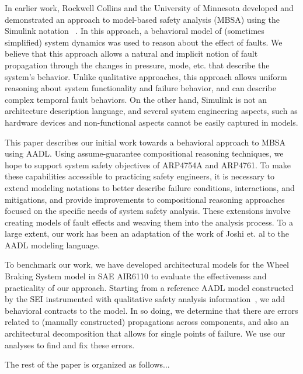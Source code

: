 In earlier work, Rockwell Collins and the University of Minnesota developed and demonstrated an approach to model-based safety analysis (MBSA)  using the Simulink notation~ .  In this approach, a behavioral model of (sometimes simplified) system dynamics was used to reason about the effect of faults.  We believe that this approach allows a natural and implicit notion of fault propagation through the changes in pressure, mode, etc. that describe the system's behavior.  Unlike qualitative approaches, this approach allows uniform reasoning about system functionality and failure behavior, and can describe complex temporal fault behaviors.  On the other hand, Simulink is not an architecture description language, and several system engineering aspects, such as hardware devices and non-functional aspects cannot be easily captured in models.

\iffalse
Over the last five years, several research groups have focused on formal reasoning at the system architecture level, resulting in MBSE tools that incorporate assume-guarantee compositional reasoning techniques~\cite{Trento and Rockwell and UMN}.  These tools allow behavioral reasoning about complex system models, but with substantially greater scalability than previous approaches.
\fi 

This paper describes our initial work towards a behavioral approach to MBSA using AADL.  Using assume-guarantee compositional reasoning techniques, we hope to support system safety objectives of ARP4754A and ARP4761.  To make these capabilities accessible to practicing safety engineers, it is necessary to extend modeling notations to better describe failure conditions, interactions, and mitigations, and provide improvements to compositional reasoning approaches focused on the specific needs of system safety analysis.  These extensions involve creating models of fault effects and weaving them into the analysis process.  To a large extent, our work has been an adaptation of the work of Joshi et. al to the AADL modeling language.

To benchmark our work, we have developed architectural models for the Wheel Braking System model in SAE AIR6110 to evaluate the effectiveness and practicality of our approach.  Starting from a reference AADL model constructed by the SEI instrumented with qualitative safety analysis information~\cite{}, we add behavioral contracts to the model.  In so doing, we determine that there are errors related to (manually constructed) propagations across components, and also an architectural decomposition that allows for single points of failure.  We use our analyses to find and fix these errors.

The rest of the paper is organized as follows...



